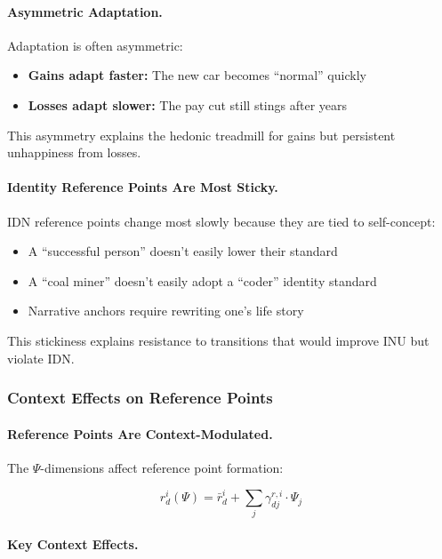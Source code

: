 \paragraph{Asymmetric Adaptation.}
Adaptation is often asymmetric:
\begin{itemize}
\item \textbf{Gains adapt faster:} The new car becomes ``normal'' quickly
\item \textbf{Losses adapt slower:} The pay cut still stings after years
\end{itemize}

This asymmetry explains the hedonic treadmill for gains but persistent 
unhappiness from losses.

\paragraph{Identity Reference Points Are Most Sticky.}
IDN reference points change most slowly because they are tied to self-concept:
\begin{itemize}
\item A ``successful person'' doesn't easily lower their standard
\item A ``coal miner'' doesn't easily adopt a ``coder'' identity standard
\item Narrative anchors require rewriting one's life story
\end{itemize}

This stickiness explains resistance to transitions that would improve 
INU but violate IDN.

\subsubsection{Context Effects on Reference Points}

\paragraph{Reference Points Are Context-Modulated.}
The $\Psi$-dimensions affect reference point formation:

\begin{equation}
r^i_d(\Psi) = \bar{r}^i_d + \sum_j \gamma^{r,i}_{dj} \cdot \Psi_j
\end{equation}

\paragraph{Key Context Effects.}

